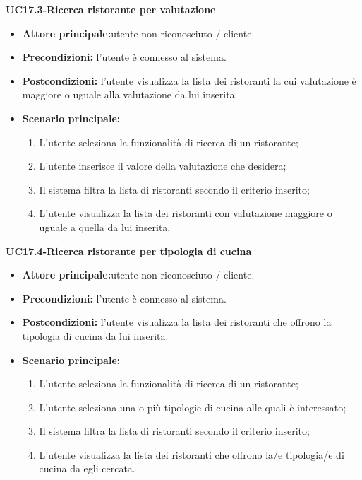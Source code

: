 \textbf{UC17.3-Ricerca ristorante per valutazione}
\begin{itemize}
\item \textbf{Attore principale:}utente non riconosciuto / cliente.
\item \textbf{Precondizioni:} l'utente è connesso al sistema.
\item \textbf{Postcondizioni:} l'utente visualizza la lista dei ristoranti la cui valutazione è maggiore o uguale alla
valutazione da lui inserita.
\item \textbf{Scenario principale:}
\begin{enumerate}
    \item L'utente seleziona la funzionalità di ricerca di un ristorante;
    \item L'utente inserisce il valore della valutazione che desidera;
    \item Il sistema filtra la lista di ristoranti secondo il criterio inserito;
    \item  L'utente visualizza la lista dei ristoranti con valutazione maggiore o uguale a quella da lui inserita.
\end{enumerate}
\end{itemize}

\textbf{UC17.4-Ricerca ristorante per tipologia di cucina}
\begin{itemize}
\item \textbf{Attore principale:}utente non riconosciuto / cliente.
\item \textbf{Precondizioni:} l'utente è connesso al sistema.
\item \textbf{Postcondizioni:} l'utente visualizza la lista dei ristoranti che offrono la tipologia di cucina
da lui inserita.
\item \textbf{Scenario principale:}
\begin{enumerate}
    \item L'utente seleziona la funzionalità di ricerca di un ristorante;
    \item L'utente seleziona una o più tipologie di cucina alle quali è interessato;
    \item Il sistema filtra la lista di ristoranti secondo il criterio inserito; 
    \item L'utente visualizza la lista dei ristoranti che offrono la/e tipologia/e di cucina da egli cercata.
\end{enumerate}
\end{itemize}

